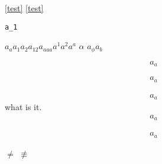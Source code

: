 \documentclass{ctexbook}
\begin{document}
\label{test}
\ref{test}
\eqref{test}

\verb|a_1|

\(a_a a_1 a_2 a_{12} a_{aaa} a^1 a^2 a^a \)
\(\alpha\)
\(a_\phi a_b\)

\begin{equation}\label{equ:1}
	a_a
\end{equation}

\begin{align}
	a_a
\end{align}

\begin{equation}
	\begin{aligned}
		a_a
	\end{aligned}
\end{equation}
what is it.
\begin{gather}
	a_a
\end{gather}

\begin{align*}
	a_a
\end{align*}

\(\not=\)
\(\not \equiv\)
\end{document}
